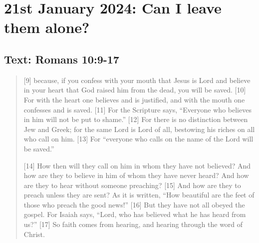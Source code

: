 \setcounter{figure}{0}

\section{21st January 2024: Can I leave them alone?}
\subsection*{Text: Romans 10:9-17}
  \begin{quote}
    [9] because, if you confess with your mouth that Jesus is Lord and
    believe in your heart that God raised him from the dead, you will be
    saved. [10] For with the heart one believes and is justified, and with
    the mouth one confesses and is saved. [11] For the Scripture says,
    “Everyone who believes in him will not be put to shame.” [12] For there
    is no distinction between Jew and Greek; for the same Lord is Lord of
    all, bestowing his riches on all who call on him. [13] For “everyone who
    calls on the name of the Lord will be saved.”

    [14] How then will they call on him in whom they have not believed? And
    how are they to believe in him of whom they have never heard? And how are
    they to hear without someone preaching? [15] And how are they to preach
    unless they are sent? As it is written, “How beautiful are the feet of
    those who preach the good news!” [16] But they have not all obeyed the
    gospel. For Isaiah says, “Lord, who has believed what he has heard from
    us?” [17] So faith comes from hearing, and hearing through the word of
    Christ.
  \end{quote}
